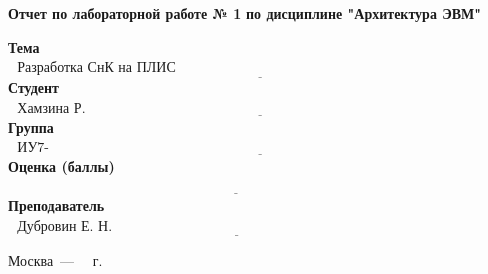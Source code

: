 \begin{titlepage}
	\begin{center}
  		\noindent\begin{minipage}{1.3\textwidth}\centering
  		\Large\textbf{   Отчет по лабораторной работе № 1}\newline
  		\textbf{по дисциплине "Архитектура ЭВМ"}\newline\newline\newline
  		\end{minipage}
	\end{center}
	
	\noindent\textbf{Тема} $\underline{\text{~~Разработка СнК на ПЛИС Altera~~~~~~~~~~~~~~~~~~~~~~~~~~~~~~~~~~~~~~~~~~~~~~~~~~~~~~~~~~~~~~~~~~~}}$\newline\newline\newline
	\noindent\textbf{Студент} $\underline{\text{~~Хамзина Р. Р.~~~~~~~~~~~~~~~~~~~~~~~~~~~~~~~~~~~~~~~~~~~~~~~~~~~~~~~~~~~~~~~~~~~~~~~~~~~~~~~~~~~~~~~~~}}$\newline\newline
	\noindent\textbf{Группа} $\underline{\text{~~ИУ7-53Б~~~~~~~~~~~~~~~~~~~~~~~~~~~~~~~~~~~~~~~~~~~~~~~~~~~~~~~~~~~~~~~~~~~~~~~~~~~~~~~~~~~~~~~~~~~~~~~~~}}$\newline\newline
	\noindent\textbf{Оценка (баллы)} $\underline{\text{~~~~~~~~~~~~~~~~~~~~~~~~~~~~~~~~~~~~~~~~~~~~~~~~~~~~~~~~~~~~~~~~~~~~~~~~~~~~~~~~~~~~~~~~~~~~~~~~~~}}$\newline\newline
	\noindent\textbf{Преподаватель} $\underline{\text{~~Дубровин Е. Н.~~~~~~~~~~~~~~~~~~~~~~~~~~~~~~~~~~~~~~~~~~~~~~~~~~~~~~~~~~~~~~~~~~~~~~~~~~~~}}$\newline
	
	\begin{center}
		\vfill
		Москва~---~\the\year
		~г.
	\end{center}
	\restoregeometry
\end{titlepage}

